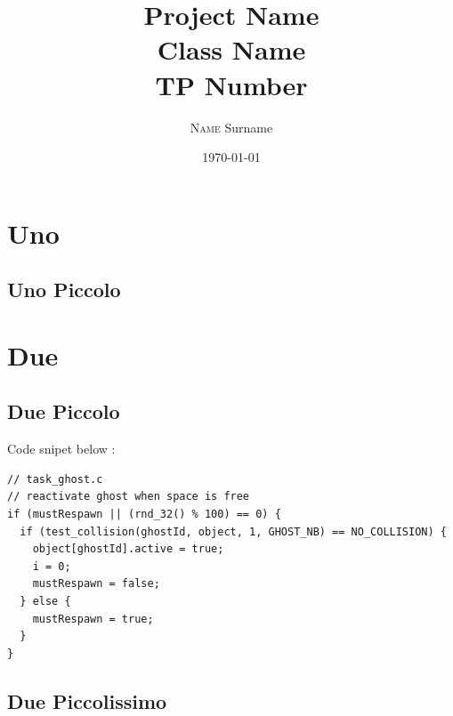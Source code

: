 \documentclass{article}
\title{\textbf{Project Name}{ \\ Class Name \\ TP Number}} %
\author{\textsc{Name} Surname}
\date{\today} %
\begin{document}
\maketitle %
\begin{center}

\end{center}

\newpage 

{\vspace*{.5cm}} \section{Uno}

\subsection{Uno Piccolo}


{\vspace*{1cm}} \section{Due}

\subsection{Due Piccolo}

%
Code snipet below : 
\\
{
\begin{lstlisting}
// task_ghost.c
// reactivate ghost when space is free
if (mustRespawn || (rnd_32() % 100) == 0) {
  if (test_collision(ghostId, object, 1, GHOST_NB) == NO_COLLISION) {
    object[ghostId].active = true;
    i = 0;
    mustRespawn = false;
  } else {
	mustRespawn = true;
  }
}

\end{lstlisting}
}

\subsection{Due Piccolissimo}
{}
\end{document}

